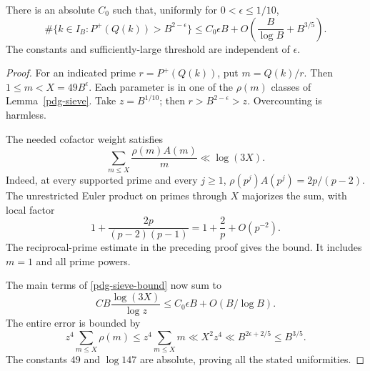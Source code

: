 \begin{theorem}\label{pdg-extreme}
There is an absolute \(C_0\) such that, uniformly for
\(0<\epsilon\leq1/10\),
\begin{equation}\label{pdg-extreme-bound}
 \#\{k\in I_B:P^+(Q(k))>B^{2-\epsilon}\}
 \leq C_0\epsilon B+
       O\left(\frac B{\log B}+B^{3/5}\right).
\end{equation}
The constants and sufficiently-large threshold are independent
of \(\epsilon\).
\end{theorem}
\begin{proof}
For an indicated prime \(r=P^+(Q(k))\), put \(m=Q(k)/r\).
Then \(1\leq m<X=49B^\epsilon\). Each parameter is in one of the
\(\rho(m)\) classes of Lemma~\ref{pdg-sieve}. Take \(z=B^{1/10}\);
then \(r>B^{2-\epsilon}>z\). Overcounting is harmless.

The needed cofactor weight satisfies
\[
 \sum_{m\leq X}\frac{\rho(m)A(m)}m\ll\log(3X).
\]
Indeed, at every supported prime and every \(j\geq1\),
\(\rho(p^j)A(p^j)=2p/(p-2)\). The unrestricted Euler product on
primes through \(X\) majorizes the sum, with local factor
\[
 1+\frac{2p}{(p-2)(p-1)}=1+\frac2p+O(p^{-2}).
\]
The reciprocal-prime estimate in the preceding proof gives the
bound. It includes \(m=1\) and all prime powers.

The main terms of \eqref{pdg-sieve-bound} now sum to
\[
 C B\frac{\log(3X)}{\log z}
       \leq C_0\epsilon B+O(B/\log B).
\]
The entire error is bounded by
\[
 z^4\sum_{m\leq X}\rho(m)
 \leq z^4\sum_{m\leq X}m
 \ll X^2z^4\ll B^{2\epsilon+2/5}\leq B^{3/5}.
\]
The constants \(49\) and \(\log147\) are absolute, proving all the
stated uniformities.
\end{proof}


